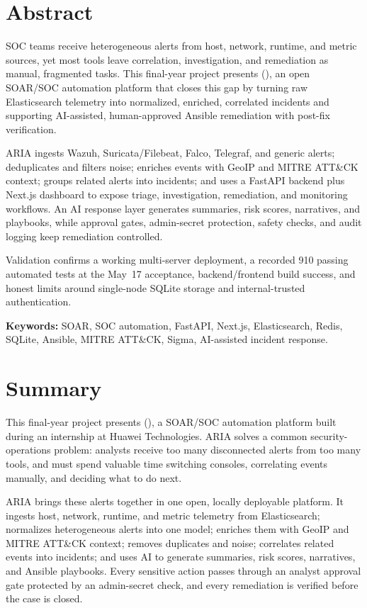 \chapter*{Abstract}

SOC teams receive heterogeneous alerts from host, network, runtime, and metric sources, yet most tools leave correlation, investigation, and remediation as manual, fragmented tasks. This final-year project presents \project{} (\projectlong{}), an open SOAR/SOC automation platform that closes this gap by turning raw Elasticsearch telemetry into normalized, enriched, correlated incidents and supporting AI-assisted, human-approved Ansible remediation with post-fix verification.

ARIA ingests Wazuh, Suricata/Filebeat, Falco, Telegraf, and generic alerts; deduplicates and filters noise; enriches events with GeoIP and MITRE ATT\&CK context; groups related alerts into incidents; and uses a FastAPI backend plus Next.js dashboard to expose triage, investigation, remediation, and monitoring workflows. An AI response layer generates summaries, risk scores, narratives, and playbooks, while approval gates, admin-secret protection, safety checks, and audit logging keep remediation controlled.

Validation confirms a working multi-server deployment, a recorded 910 passing automated tests at the May~17 acceptance, backend/frontend build success, and honest limits around single-node SQLite storage and internal-trusted authentication.

\textbf{Keywords:} SOAR, SOC automation, FastAPI, Next.js, Elasticsearch, Redis, SQLite, Ansible, MITRE ATT\&CK, Sigma, AI-assisted incident response.

\vspace{1cm}
\chapter*{Summary}

This final-year project presents \project{} (\projectlong{}), a SOAR/SOC automation platform built during an internship at Huawei Technologies. ARIA solves a common security-operations problem: analysts receive too many disconnected alerts from too many tools, and must spend valuable time switching consoles, correlating events manually, and deciding what to do next.

ARIA brings these alerts together in one open, locally deployable platform. It ingests host, network, runtime, and metric telemetry from Elasticsearch; normalizes heterogeneous alerts into one model; enriches them with GeoIP and MITRE ATT\&CK context; removes duplicates and noise; correlates related events into incidents; and uses AI to generate summaries, risk scores, narratives, and Ansible playbooks. Every sensitive action passes through an analyst approval gate protected by an admin-secret check, and every remediation is verified before the case is closed.

